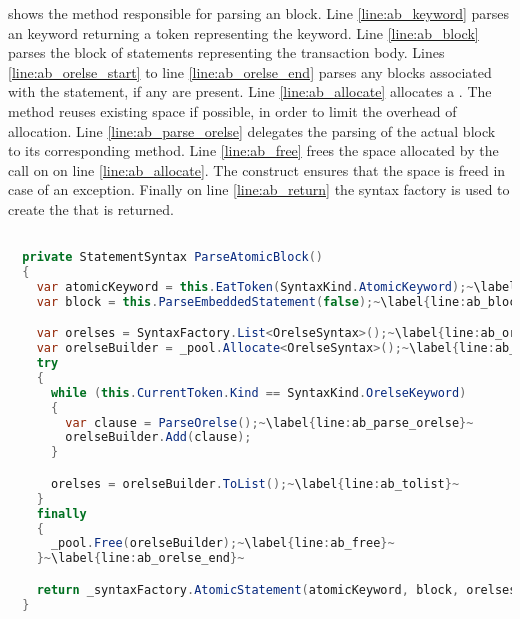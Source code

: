  shows the  method responsible for parsing an  block. Line \ref{line:ab_keyword} parses an  keyword returning a token representing the keyword. Line \ref{line:ab_block} parses the block of statements representing the transaction body. Lines \ref{line:ab_orelse_start} to line \ref{line:ab_orelse_end} parses any  blocks associated with the  statement, if any are present. Line \ref{line:ab_allocate} allocates a . The  method reuses existing space if possible, in order to limit the overhead of allocation. Line \ref{line:ab_parse_orelse} delegates the parsing of the actual  block to its corresponding method. Line \ref{line:ab_free} frees the space allocated by the call on on line \ref{line:ab_allocate}. The  construct ensures that the space is freed in case of an exception. Finally on line \ref{line:ab_return} the syntax factory is used to create the  that is returned.

\begin{lstlisting}[label=lst:parse_atomic_block,
  caption={Method for parsing \bscode{atomic} block},
  language=Java,  
  showspaces=false,
  showtabs=false,
  breaklines=true,
  showstringspaces=false,
  breakatwhitespace=true,
  commentstyle=\color{greencomments},
  keywordstyle=\color{bluekeywords},
  stringstyle=\color{redstrings},
  escapechar=~,
  morekeywords={atomic, retry, orElse, var, get, set}]  % Start your code-block

  private StatementSyntax ParseAtomicBlock()
  { 
    var atomicKeyword = this.EatToken(SyntaxKind.AtomicKeyword);~\label{line:ab_keyword}~
    var block = this.ParseEmbeddedStatement(false);~\label{line:ab_block}~

    var orelses = SyntaxFactory.List<OrelseSyntax>();~\label{line:ab_orelse_start}~
    var orelseBuilder = _pool.Allocate<OrelseSyntax>();~\label{line:ab_allocate}~
    try
    {
      while (this.CurrentToken.Kind == SyntaxKind.OrelseKeyword)
      {
        var clause = ParseOrelse();~\label{line:ab_parse_orelse}~
        orelseBuilder.Add(clause);
      }

      orelses = orelseBuilder.ToList();~\label{line:ab_tolist}~
    }
    finally
    {
      _pool.Free(orelseBuilder);~\label{line:ab_free}~
    }~\label{line:ab_orelse_end}~

    return _syntaxFactory.AtomicStatement(atomicKeyword, block, orelses);~\label{line:ab_return}~
  }
\end{lstlisting}

